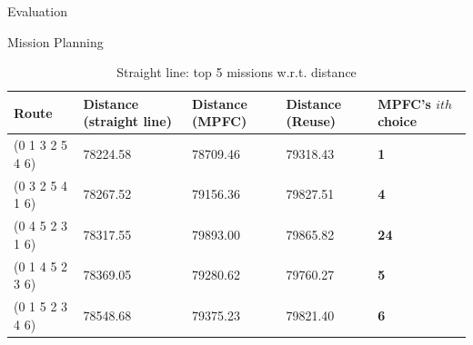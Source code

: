 \documentclass[9pt]{beamer}
\begin{document}
\begin{frame}{Evaluation}
\begin{block}{Mission Planning}
\begin{table}[H]
    \begin{tabular}{|l|l|l|l|l|}
\hline
Route & Distance (straight line) & Distance (MPFC) & Distance (Reuse) & \textbf{MPFC's $ith$ choice} \\
\hline
 (0 1 3 2 5 4 6) & 78224.58 & 78709.46 & 79318.43 & \textbf{1} \\
\hline 
 (0 3 2 5 4 1 6) & 78267.52 & 79156.36 & 79827.51 & \textbf{4} \\
\hline
 (0 4 5 2 3 1 6) & 78317.55 & 79893.00 & 79865.82 & \textbf{24} \\
\hline
 (0 1 4 5 2 3 6) & 78369.05 & 79280.62 & 79760.27 & \textbf{5} \\
\hline 
 (0 1 5 2 3 4 6) & 78548.68 & 79375.23 & 79821.40 & \textbf{6} \\
\hline 
    \end{tabular}
    \caption[Straight line: top 5 missions with respect to distance]{Straight line: top 5 missions w.r.t. distance}
    \label{tbl:straight_solutions_top5}
\end{table}
    \end{block}
\end{frame}

\end{document}
